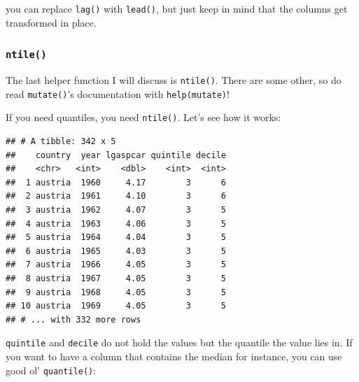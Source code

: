 \documentclass[]{gitbook}
\newenvironment{Shaded}{\begin{snugshade}}{\end{snugshade}}
\newcommand{\CommentTok}[1]{\textcolor[rgb]{0.56,0.35,0.01}{\textit{#1}}}
\newcommand{\DataTypeTok}[1]{\textcolor[rgb]{0.13,0.29,0.53}{#1}}
\newcommand{\DecValTok}[1]{\textcolor[rgb]{0.00,0.00,0.81}{#1}}
\newcommand{\FloatTok}[1]{\textcolor[rgb]{0.00,0.00,0.81}{#1}}
\newcommand{\KeywordTok}[1]{\textcolor[rgb]{0.13,0.29,0.53}{\textbf{#1}}}
\newcommand{\NormalTok}[1]{#1}
\newcommand{\OperatorTok}[1]{\textcolor[rgb]{0.81,0.36,0.00}{\textbf{#1}}}
\newcommand{\StringTok}[1]{\textcolor[rgb]{0.31,0.60,0.02}{#1}}
\theoremstyle{definition}
\theoremstyle{definition}
\theoremstyle{definition}
\theoremstyle{remark}
\begin{document}
you can replace \texttt{lag()} with \texttt{lead()}, but just keep in
mind that the columns get transformed in place.

\hypertarget{ntile}{%
\subsubsection{\texorpdfstring{\texttt{ntile()}}{ntile()}}\label{ntile}}

The last helper function I will discuss is \texttt{ntile()}. There are
some other, so do read \texttt{mutate()}'s documentation with
\texttt{help(mutate)}!

If you need quantiles, you need \texttt{ntile()}. Let's see how it
works:

\begin{Shaded}
\end{Shaded}

\begin{verbatim}
## # A tibble: 342 x 5
##    country  year lgaspcar quintile decile
##    <chr>   <int>    <dbl>    <int>  <int>
##  1 austria  1960     4.17        3      6
##  2 austria  1961     4.10        3      6
##  3 austria  1962     4.07        3      5
##  4 austria  1963     4.06        3      5
##  5 austria  1964     4.04        3      5
##  6 austria  1965     4.03        3      5
##  7 austria  1966     4.05        3      5
##  8 austria  1967     4.05        3      5
##  9 austria  1968     4.05        3      5
## 10 austria  1969     4.05        3      5
## # ... with 332 more rows
\end{verbatim}

\texttt{quintile} and \texttt{decile} do not hold the values but the
quantile the value lies in. If you want to have a column that contains
the median for instance, you can use good ol' \texttt{quantile()}:

\begin{Shaded}
\end{Shaded}
\end{document}
